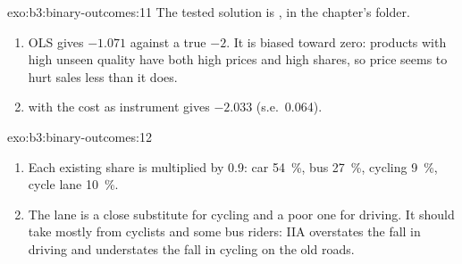 \begin{solution}{exo:b3:binary-outcomes:11}
The tested solution is , in the chapter's
 folder.
\begin{enumerate}
\item OLS gives $-1.071$ against a true $-2$. %
It is biased toward zero: products with high unseen quality have both high
prices and high shares, so price seems to hurt sales less than it does.
\item {} with the cost as instrument gives $-2.033$
(s.e.\ 0.064).
\end{enumerate}
\end{solution}

\begin{solution}{exo:b3:binary-outcomes:12}
\begin{enumerate}
\item Each existing share is multiplied by 0.9: car 54~\%, bus 27~\%, cycling
9~\%, cycle lane 10~\%.
\item The lane is a close substitute for cycling and a poor one for driving. It
should take mostly from cyclists and some bus riders: IIA overstates the fall in
driving and understates the fall in cycling on the old roads.
\end{enumerate}
\end{solution}

